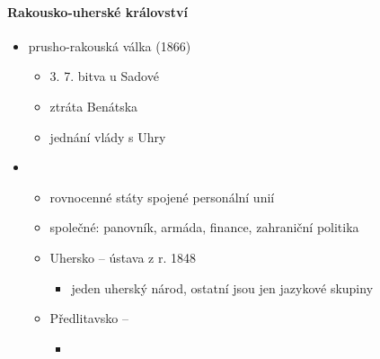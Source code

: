 \paragraph{Rakousko-uherské království}
\begin{itemize}
\item prusho-rakouská válka (1866)
	\begin{itemize}
	\item 3. 7. bitva u Sadové
	\item ztráta Benátska
	\item jednání vlády s Uhry
	\end{itemize}
	
\item {}
	\begin{itemize}
	\item rovnocenné státy spojené personální unií
	\item společné: panovník, armáda, finance, zahraniční politika
	\item Uhersko -- ústava z r. 1848
		\begin{itemize}
		\item jeden uherský národ, ostatní jsou jen jazykové skupiny
		\end{itemize}
	\item Předlitavsko -- 
		\begin{itemize}
		\item 
		\end{itemize}		 
	\end{itemize}
\end{itemize}

